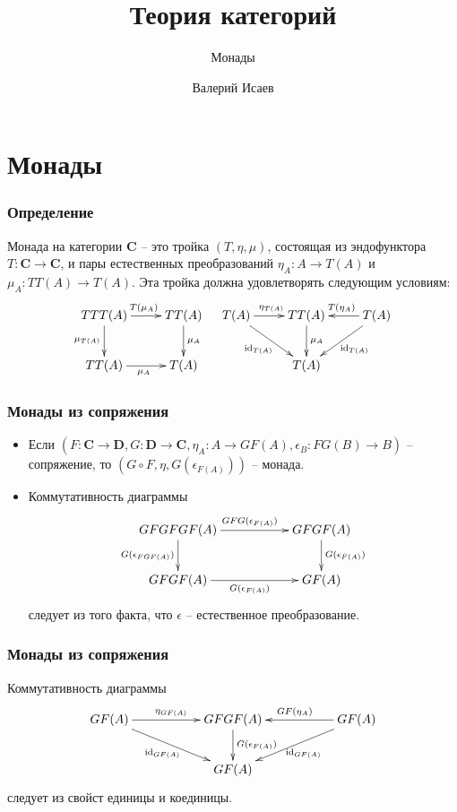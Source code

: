 \documentclass{beamer}
\theoremstyle{definition}
\newcommand{\cat}[1]{\mathbf{#1}}
\renewcommand{\C}{\cat{C}}
\newcommand{\D}{\cat{D}}
\newcommand{\fs}[1]{\mathrm{#1}}
\newcommand{\id}{\fs{id}}
\begin{document}
\title{Теория категорий}
\subtitle{Монады}
\author{Валерий Исаев}
\maketitle

\section{Монады}

\begin{frame}
\frametitle{Определение}
\begin{defn}
Монада на категории $\C$ -- это тройка $(T,\eta,\mu)$, состоящая из эндофунктора $T : \C \to \C$, и пары естественных преобразований $\eta_A : A \to T(A)$ и $\mu_A : TT(A) \to T(A)$.
Эта тройка должна удовлетворять следующим условиям:
\[ \xymatrix{ TTT(A) \ar[r]^{T(\mu_A)} \ar[d]_{\mu_{T(A)} } & TT(A) \ar[d]^{\mu_A} \\
              TT(A) \ar[r]_{\mu_A}                          & T(A)
            }
\quad
   \xymatrix{ T(A) \ar[r]^{\eta_{T(A)}} \ar[rd]_{\id_{T(A)}} & TT(A) \ar[d]^{\mu_A} & T(A) \ar[l]_{T(\eta_A)} \ar[dl]^{\id_{T(A)}} \\
                                                            & T(A)
            } \]
\end{defn}
\end{frame}

\begin{frame}
\frametitle{Монады из сопряжения}
\begin{itemize}
\item Если $(F : \C \to \D, G : \D \to \C, \eta_A : A \to GF(A), \epsilon_B : FG(B) \to B)$ -- сопряжение, то $(G \circ F, \eta, G(\epsilon_{F(A)}))$ -- монада.
\item Коммутативность диаграммы
\[ \xymatrix{ GFGFGF(A) \ar[rr]^{GFG(\epsilon_{F(A)})} \ar[d]_{G(\epsilon_{FGF(A)})} & & GFGF(A) \ar[d]^{G(\epsilon_{F(A)})} \\
              GFGF(A) \ar[rr]_{G(\epsilon_{F(A)})}                                   & & GF(A)
            } \]
следует из того факта, что $\epsilon$ -- естественное преобразование.
\end{itemize}
\end{frame}

\begin{frame}
\frametitle{Монады из сопряжения}
Коммутативность диаграммы
\[ \xymatrix{ GF(A) \ar[rr]^{\eta_{GF(A)}} \ar[rrd]_{\id_{GF(A)}} & & GFGF(A) \ar[d]^{G(\epsilon_{F(A)})} & & GF(A) \ar[ll]_{GF(\eta_A)} \ar[dll]^{\id_{GF(A)}} \\
                                                                 & & GF(A)
            } \]
следует из свойст единицы и коединицы.
\end{frame}
\end{document}
